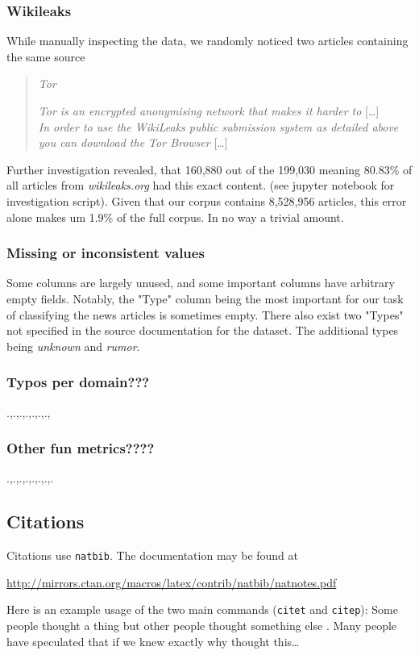 \documentclass{article}
\begin{document}
\subsubsection{Wikileaks}
While manually inspecting the data, we randomly noticed two articles containing the same source
\begin{quote}
    \textit{Tor}

    \textit{Tor is an encrypted anonymising network that makes it harder to} [\dots]\\
    \textit{In order to use the WikiLeaks public submission system as detailed above you can download the Tor Browser} [\dots]
\end{quote}
Further investigation revealed, that 160,880 out of the 199,030 meaning 80.83\% of all articles from \emph{wikileaks.org} had this exact content. (see jupyter notebook for investigation script). Given that our corpus contains 8,528,956 articles, this error alone makes um 1.9\% of the full corpus. In no way a trivial amount.
\subsubsection{Missing or inconsistent values}
Some columns are largely unused, and some important columns have arbitrary empty fields. Notably, the "Type" column being the most important for our task of classifying the news articles is sometimes empty. There also exist two "Types" not specified in the source documentation for the dataset. The additional types being \emph{unknown} and \emph{rumor}.
\subsubsection{Typos per domain???}
.,.,.,.,.,.,.,
\subsubsection{Other fun metrics????}
.,.,.,.,.,.,.,.
\newpage

\subsection{Citations}
Citations use \verb+natbib+. The documentation may be found at
\begin{center}
	\url{http://mirrors.ctan.org/macros/latex/contrib/natbib/natnotes.pdf}
\end{center}

Here is an example usage of the two main commands (\verb+citet+ and \verb+citep+): Some people thought a thing \citep{kour2014real, hadash2018estimate} but other people thought something else \citep{kour2014fast}. Many people have speculated that if we knew exactly why \citet{kour2014fast} thought this\dots
\end{document}
